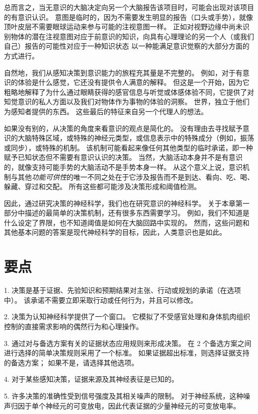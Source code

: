 总而言之，当无意识的大脑决定向另一个大脑报告该项目时，可能会出现对该项目的有意识认识。
意图是临时的，因为不需要发生明显的报告（口头或手势），就像顶叶皮层不需要眼球运动来参与可能的注视意图一样。
正如对视野边缘中尚未识别物体的潜在注视意图对应于前意识的知识，向具有心理理论的另一个人（或我们自己）报告的可能性对应于一种知识状态 以一种能满足意识觉察的大部分方面的方式进行。


自然地，我们从感知决策到意识能力的旅程充其量是不完整的。
例如，对于有意识的体验是什么感觉，它还没有提供令人满意的解释。
但这是一个开始，因为它粗略地解释了为什么通过眼睛获得的感官信息与听觉或体感体验不同，它提供了对知觉意识的私人方面以及我们对物体作为事物的体验的洞察。
世界，独立于他们为感知者提供的东西。
这些最后的特征来自另一个代理人的想法。


如果没有别的，从决策的角度来看意识的观点是简化的。
没有理由去寻找赋予意识的大脑特殊区域，或特殊的神经元类型，或信息表示中的特殊成分（例如，振荡或同步），或特殊的机制。
该机制可能看起来像任何其他类型的临时承诺，即一种赋予已知状态但不需要有意识认识的决策。
当然，大脑活动本身并不是有意识的，就像支持可能手势的大脑活动不是手势本身一样。
从这个意义上说，意识机制与其他\textit{功能可供性}的唯一不同之处在于它涉及报告而不是到达、看向、吃、喝、躲藏、穿过和交配。
所有这些都可能涉及决策形成和阈值检测。


因此，通过研究决策的神经科学，我们也在研究意识的神经科学。
关于本章第一部分中描述的最简单的决策机制，还有很多东西需要学习。
例如，我们不知道是什么设定了界限，也不知道阈值是如何在大脑回路中实现的。
然而，这些问题和其他基本问题的答案是现代神经科学的目标，因此，人类意识也是如此。



\section{要点}

1. 决策是基于证据、先验知识和预期结果对主张、行动或规划的承诺（在选项中）。
该承诺不需要立即采取行动或任何行为，并且可以修改。 


2. 决策为认知神经科学提供了一个窗口。
它模拟了不受感官处理和身体肌肉组织控制的直接需求影响的偶然行为和心理操作。


3. 通过对与备选方案有关的证据状态应用规则来形成决策。
在 2 个备选方案之间进行选择的简单决策规则采用了一个标准。
如果证据超出标准，则选择证据支持的备选方案；
如果不是，请选择其他选项。


4. 对于某些感知决策，证据来源及其神经表征是已知的。


5. 许多决策的准确性受到信号强度及其相关噪声的限制。
对于神经系统，这种噪声归因于单个神经元的可变放电，因此代表证据的少量神经元的可变放电率。


